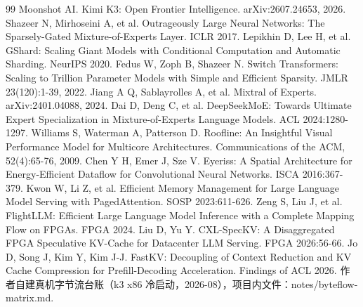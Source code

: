 \documentclass[11pt]{ctexart}
\begin{document}
\begin{thebibliography}{99}
 Moonshot AI. Kimi K3: Open Frontier Intelligence. arXiv:2607.24653, 2026.
 Shazeer N, Mirhoseini A, et al. Outrageously Large Neural Networks: The Sparsely-Gated Mixture-of-Experts Layer. ICLR 2017.
 Lepikhin D, Lee H, et al. GShard: Scaling Giant Models with Conditional Computation and Automatic Sharding. NeurIPS 2020.
 Fedus W, Zoph B, Shazeer N. Switch Transformers: Scaling to Trillion Parameter Models with Simple and Efficient Sparsity. JMLR 23(120):1-39, 2022.
 Jiang A Q, Sablayrolles A, et al. Mixtral of Experts. arXiv:2401.04088, 2024.
 Dai D, Deng C, et al. DeepSeekMoE: Towards Ultimate Expert Specialization in Mixture-of-Experts Language Models. ACL 2024:1280-1297.
 Williams S, Waterman A, Patterson D. Roofline: An Insightful Visual Performance Model for Multicore Architectures. Communications of the ACM, 52(4):65-76, 2009.
 Chen Y H, Emer J, Sze V. Eyeriss: A Spatial Architecture for Energy-Efficient Dataflow for Convolutional Neural Networks. ISCA 2016:367-379.
 Kwon W, Li Z, et al. Efficient Memory Management for Large Language Model Serving with PagedAttention. SOSP 2023:611-626.
 Zeng S, Liu J, et al. FlightLLM: Efficient Large Language Model Inference with a Complete Mapping Flow on FPGAs. FPGA 2024.
 Liu D, Yu Y. CXL-SpecKV: A Disaggregated FPGA Speculative KV-Cache for Datacenter LLM Serving. FPGA 2026:56-66.
 Jo D, Song J, Kim Y, Kim J-J. FastKV: Decoupling of Context Reduction and KV Cache Compression for Prefill-Decoding Acceleration. Findings of ACL 2026.
 作者自建真机字节流台账（k3 x86 冷启动，2026-08），项目内文件：notes/byteflow-matrix.md.
\end{thebibliography}
\end{document}
